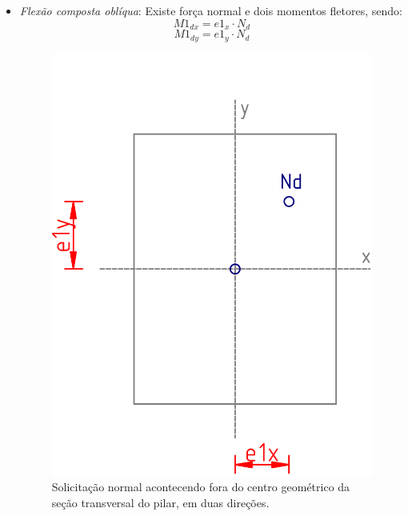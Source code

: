 \begin{itemize}
\begin{itemize}
     			\item \textit{Flexão composta oblíqua}: Existe força normal e dois momentos fletores, sendo:
				$$M1_{dx}=e1_x\cdot N_d$$
				\begin{equation}M1_{dy}=e1_y\cdot N_d\end{equation}

				\begin{figure}[H]
					\begin{center}
						\caption{Solicitação normal acontecendo fora do centro geométrico da seção transversal do pilar, em duas direções.}    	
						\includegraphics[height=0.45\textwidth]{Solicitacoes-normais/Imagens/Flexao-composta-obliqua.png}
					\end{center}
				\end{figure}

  		\end{itemize}

\end{itemize}

